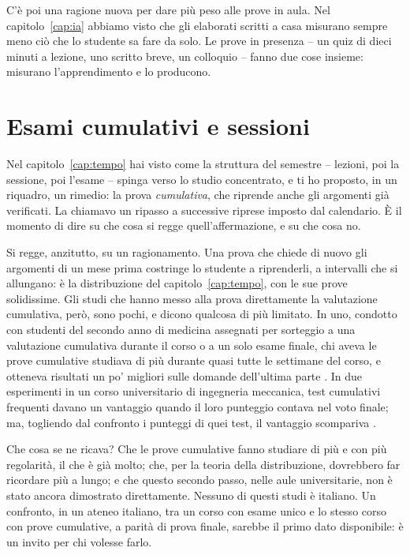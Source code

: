 C'è poi una ragione nuova per dare più peso alle prove in aula. Nel
capitolo~\ref{cap:ia} abbiamo visto che gli elaborati scritti a casa
misurano sempre meno ciò che lo studente sa fare da solo. Le prove in
presenza -- un quiz di dieci minuti a lezione, uno scritto breve, un
colloquio -- fanno due cose insieme: misurano l'apprendimento e lo
producono.

\section{Esami cumulativi e sessioni}

Nel capitolo~\ref{cap:tempo} hai visto come la struttura del semestre
-- lezioni, poi la sessione, poi l'esame -- spinga verso lo studio
concentrato, e ti ho proposto, in un riquadro, un rimedio: la prova
\emph{cumulativa}, che riprende anche gli argomenti già verificati. La
chiamavo un ripasso a successive riprese imposto dal calendario. È il
momento di dire su che cosa si regge quell'affermazione, e su che cosa
no.

Si regge, anzitutto, su un ragionamento. Una prova che chiede di
nuovo gli argomenti di un mese prima costringe lo studente a
riprenderli, a intervalli che si allungano: è la distribuzione del
capitolo~\ref{cap:tempo}, con le sue prove solidissime. Gli studi che
hanno messo alla prova direttamente la valutazione cumulativa, però,
sono pochi, e dicono qualcosa di più limitato. In uno, condotto con
studenti del secondo anno di medicina assegnati per sorteggio a una
valutazione cumulativa durante il corso o a un solo esame finale,
chi aveva le prove cumulative studiava di più durante quasi tutte le
settimane del corso, e otteneva risultati un po' migliori sulle
domande dell'ultima parte \parencite{kerdijk2015}. In due esperimenti
in un corso universitario di ingegneria meccanica, test cumulativi
frequenti davano un vantaggio quando il loro punteggio contava nel voto
finale; ma, togliendo dal confronto i punteggi di quei test, il
vantaggio scompariva \parencite{denboer2021}.

Che cosa se ne ricava? Che le prove cumulative fanno studiare di più
e con più regolarità, il che è già molto; che, per la teoria della
distribuzione, dovrebbero far ricordare più a lungo; e che questo
secondo passo, nelle aule universitarie, non è stato ancora dimostrato
direttamente. Nessuno di questi studi è italiano. Un confronto, in un
ateneo italiano, tra un corso con esame unico e lo stesso corso con
prove cumulative, a parità di prova finale, sarebbe il primo dato
disponibile: è un invito per chi volesse farlo.

